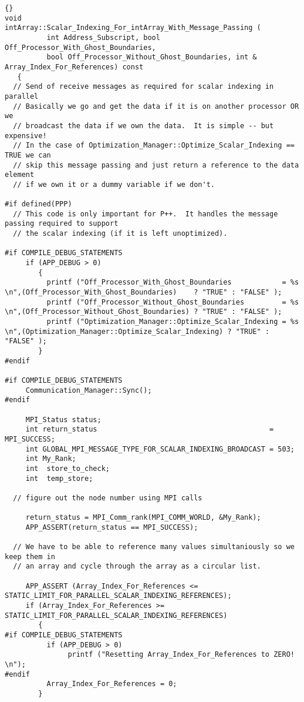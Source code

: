 \documentclass[10pt]{llncs}
\begin{document}
\vspace{0.5in}

\begin{lstlisting}{}
void
intArray::Scalar_Indexing_For_intArray_With_Message_Passing (
          int Address_Subscript, bool Off_Processor_With_Ghost_Boundaries,
          bool Off_Processor_Without_Ghost_Boundaries, int & Array_Index_For_References) const
   {
  // Send of receive messages as required for scalar indexing in parallel
  // Basically we go and get the data if it is on another processor OR we
  // broadcast the data if we own the data.  It is simple -- but expensive!
  // In the case of Optimization_Manager::Optimize_Scalar_Indexing == TRUE we can
  // skip this message passing and just return a reference to the data element
  // if we own it or a dummy variable if we don't.

#if defined(PPP)
  // This code is only important for P++.  It handles the message passing required to support
  // the scalar indexing (if it is left unoptimized).

#if COMPILE_DEBUG_STATEMENTS
     if (APP_DEBUG > 0)
        {
          printf ("Off_Processor_With_Ghost_Boundaries            = %s \n",(Off_Processor_With_Ghost_Boundaries)    ? "TRUE" : "FALSE" );
          printf ("Off_Processor_Without_Ghost_Boundaries         = %s \n",(Off_Processor_Without_Ghost_Boundaries) ? "TRUE" : "FALSE" );
          printf ("Optimization_Manager::Optimize_Scalar_Indexing = %s \n",(Optimization_Manager::Optimize_Scalar_Indexing) ? "TRUE" : "FALSE" );
        }
#endif

#if COMPILE_DEBUG_STATEMENTS
     Communication_Manager::Sync();
#endif

     MPI_Status status;
     int return_status                                         = MPI_SUCCESS;
     int GLOBAL_MPI_MESSAGE_TYPE_FOR_SCALAR_INDEXING_BROADCAST = 503;
     int My_Rank;
     int  store_to_check;
     int  temp_store;

  // figure out the node number using MPI calls

     return_status = MPI_Comm_rank(MPI_COMM_WORLD, &My_Rank);
     APP_ASSERT(return_status == MPI_SUCCESS);

  // We have to be able to reference many values simultaniously so we keep them in
  // an array and cycle through the array as a circular list.

     APP_ASSERT (Array_Index_For_References <= STATIC_LIMIT_FOR_PARALLEL_SCALAR_INDEXING_REFERENCES);
     if (Array_Index_For_References >= STATIC_LIMIT_FOR_PARALLEL_SCALAR_INDEXING_REFERENCES)
        {
#if COMPILE_DEBUG_STATEMENTS
          if (APP_DEBUG > 0)
               printf ("Resetting Array_Index_For_References to ZERO! \n");
#endif
          Array_Index_For_References = 0;
        }


\end{lstlisting}
\end{document}
